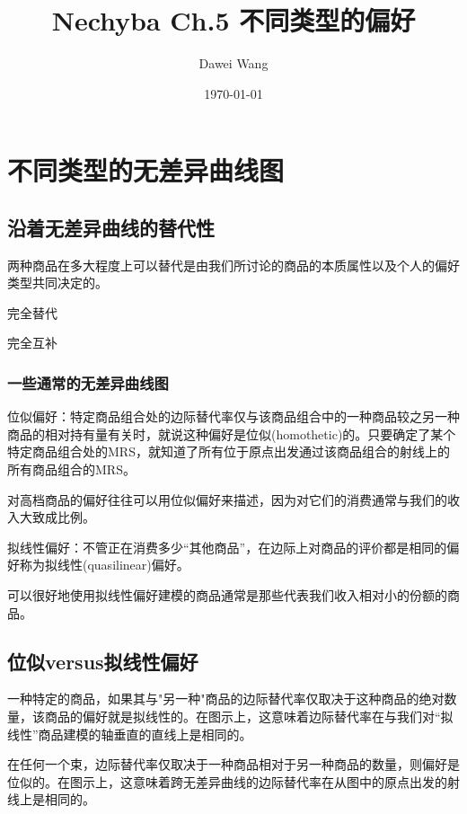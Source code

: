 \documentclass{article}
\title{Nechyba Ch.5 不同类型的偏好}
\author{Dawei Wang}
\date{\today}
\begin{document}
	\maketitle
\section{不同类型的无差异曲线图}
\subsection{沿着无差异曲线的替代性}
两种商品在多大程度上可以替代是由我们所讨论的商品的本质属性以及个人的偏好类型共同决定的。

\hspace*{\fill}

完全替代

\hspace*{\fill}

完全互补

\subsubsection{一些通常的无差异曲线图}

位似偏好：特定商品组合处的边际替代率仅与该商品组合中的一种商品较之另一种商品的相对持有量有关时，就说这种偏好是位似(homothetic)的。只要确定了某个特定商品组合处的MRS，就知道了所有位于原点出发通过该商品组合的射线上的所有商品组合的MRS。

对高档商品的偏好往往可以用位似偏好来描述，因为对它们的消费通常与我们的收入大致成比例。

\hspace*{\fill}

拟线性偏好：不管正在消费多少“其他商品”，在边际上对商品的评价都是相同的偏好称为拟线性(quasilinear)偏好。

可以很好地使用拟线性偏好建模的商品通常是那些代表我们收入相对小的份额的商品。

\subsection{位似versus拟线性偏好}
一种特定的商品，如果其与"另一种"商品的边际替代率仅取决于这种商品的绝对数量，该商品的偏好就是拟线性的。在图示上，这意味着边际替代率在与我们对“拟线性”商品建模的轴垂直的直线上是相同的。

在任何一个束，边际替代率仅取决于一种商品相对于另一种商品的数量，则偏好是位似的。在图示上，这意味着跨无差异曲线的边际替代率在从图中的原点出发的射线上是相同的。
\end{document}
